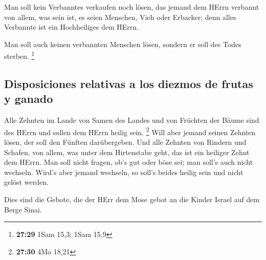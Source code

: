  Man soll kein Verbanntes verkaufen noch lösen, das
jemand dem HErrn verbannt von allem, was sein ist, es seien Menschen,
Vieh oder Erbacker; denn alles Verbannte ist ein Hochheiliges dem HErrn.

 Man soll auch keinen verbannten Menschen lösen, sondern
er soll des Todes sterben. \footnote{\textbf{27:29} 1Sam 15,3; 1Sam 15,9}

\hypertarget{disposiciones-relativas-a-los-diezmos-de-frutas-y-ganado}{%
\subsection{Disposiciones relativas a los diezmos de frutas y
ganado}\label{disposiciones-relativas-a-los-diezmos-de-frutas-y-ganado}}

 Alle Zehnten im Lande von Samen des Landes und von
Früchten der Bäume sind des HErrn und sollen dem HErrn heilig sein.
\footnote{\textbf{27:30} 4Mo 18,21}  Will aber jemand
seinen Zehnten lösen, der soll den Fünften darübergeben. 
Und alle Zehnten von Rindern und Schafen, von allem, was unter dem
Hirtenstabe geht, das ist ein heiliger Zehnt dem HErrn. 
Man soll nicht fragen, ob's gut oder böse sei; man soll's auch nicht
wechseln. Wird's aber jemand wechseln, so soll's beides heilig sein und
nicht gelöst werden.

 Dies sind die Gebote, die der HErr dem Mose gebot an die
Kinder Israel auf dem Berge Sinai.
